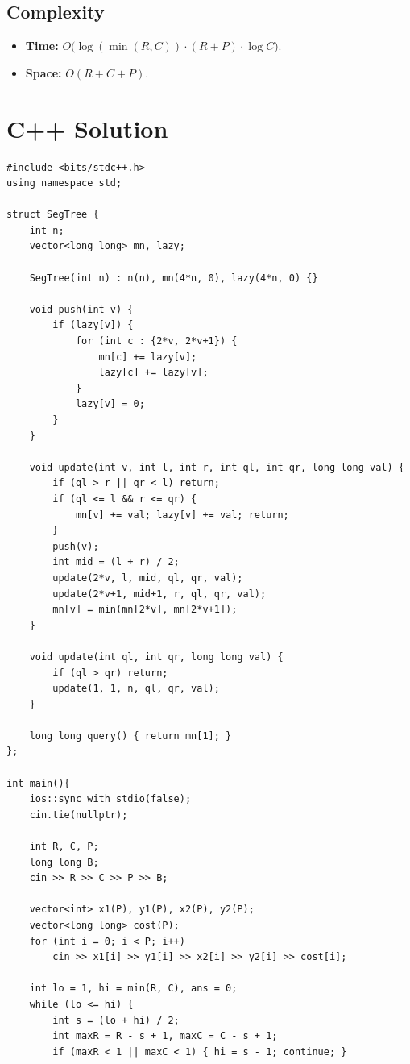 \documentclass[11pt,a4paper]{article}
\begin{document}
\subsection{Complexity}
\begin{itemize}
    \item \textbf{Time:} $O\bigl(\log(\min(R,C)) \cdot (R + P) \cdot \log C\bigr)$.
    \item \textbf{Space:} $O(R + C + P)$.
\end{itemize}

\section{C++ Solution}

\begin{lstlisting}
#include <bits/stdc++.h>
using namespace std;

struct SegTree {
    int n;
    vector<long long> mn, lazy;

    SegTree(int n) : n(n), mn(4*n, 0), lazy(4*n, 0) {}

    void push(int v) {
        if (lazy[v]) {
            for (int c : {2*v, 2*v+1}) {
                mn[c] += lazy[v];
                lazy[c] += lazy[v];
            }
            lazy[v] = 0;
        }
    }

    void update(int v, int l, int r, int ql, int qr, long long val) {
        if (ql > r || qr < l) return;
        if (ql <= l && r <= qr) {
            mn[v] += val; lazy[v] += val; return;
        }
        push(v);
        int mid = (l + r) / 2;
        update(2*v, l, mid, ql, qr, val);
        update(2*v+1, mid+1, r, ql, qr, val);
        mn[v] = min(mn[2*v], mn[2*v+1]);
    }

    void update(int ql, int qr, long long val) {
        if (ql > qr) return;
        update(1, 1, n, ql, qr, val);
    }

    long long query() { return mn[1]; }
};

int main(){
    ios::sync_with_stdio(false);
    cin.tie(nullptr);

    int R, C, P;
    long long B;
    cin >> R >> C >> P >> B;

    vector<int> x1(P), y1(P), x2(P), y2(P);
    vector<long long> cost(P);
    for (int i = 0; i < P; i++)
        cin >> x1[i] >> y1[i] >> x2[i] >> y2[i] >> cost[i];

    int lo = 1, hi = min(R, C), ans = 0;
    while (lo <= hi) {
        int s = (lo + hi) / 2;
        int maxR = R - s + 1, maxC = C - s + 1;
        if (maxR < 1 || maxC < 1) { hi = s - 1; continue; }


\end{lstlisting}
\end{document}
